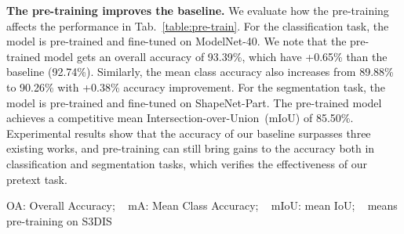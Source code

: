 \documentclass[journal]{IEEEtran}
\begin{document}
\textbf{The pre-training improves the baseline.} We evaluate how the pre-training affects the performance in Tab.~\ref{table:pre-train}. For the classification task, the model is pre-trained and fine-tuned on ModelNet-40. We note that the pre-trained model gets an overall accuracy of 93.39\%, which have +0.65\% than the baseline (92.74\%). Similarly, the mean class accuracy also increases from 89.88\% to 90.26\% with +0.38\% accuracy improvement. For the segmentation task, the model is pre-trained and fine-tuned on ShapeNet-Part. The pre-trained model achieves a competitive mean Intersection-over-Union~(mIoU) of 85.50\%. Experimental results show that the accuracy of our baseline surpasses three existing works, and pre-training can still bring gains to the accuracy both in classification and segmentation tasks, which verifies the effectiveness of our pretext task. 









\begin{table}[t]
\footnotesize
\begin{center}
\vspace{-0.2cm}
\setlength{\tabcolsep}{1.0mm} {
}
\end{center}
\caption{\textcolor{black}{The performance of our method in the real-scan dataset. We pre-train the model on S3DIS and fine-tune the model in 3 different tasks. The results suggest a consistent improvement.}} 
OA: Overall Accuracy; ~
mA: Mean Class Accuracy; ~
mIoU: mean IoU; ~
 means pre-training on S3DIS
\label{table:s3dis}
\end{table}
\end{document}
